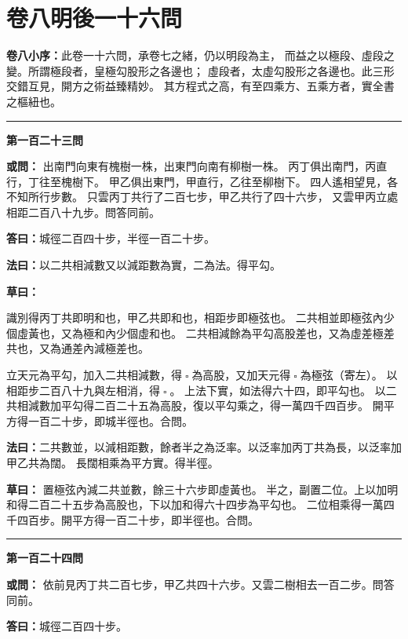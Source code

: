 \documentclass[11pt,a4paper]{article}
\let\origsquare\square
\renewcommand{\square}{\ensuremath{\origsquare}}%
\newcommand{\longline}{\noindent\rule{\textwidth}{0.4pt}}
\newcommand{\owen}[1]{%
  \par\vspace{0.4em}%
  \noindent\textcolor{problemcolor}{\textbf{或問：}}{\tradfont #1}\par\nopagebreak%
}
\newcommand{\fayue}[1]{%
  \par\noindent\textcolor{methodcolor}{\textbf{法曰：}}{\tradfont #1}\par\nopagebreak%
}
\newcommand{\tsaoyue}[1]{%
  \par\noindent\textcolor{workcolor}{\textbf{草曰：}}{\tradfont #1}\par%
}
\newcommand{\dayue}[1]{%
  \par\noindent\textcolor{anscolor}{\textbf{答曰：}}{\tradfont #1}\par\nopagebreak%
}
\newcommand{\wen}[1]{\par\vspace{0.3em}\noindent\textcolor{problemcolor}{\textbf{第#1問}}\par}
\begin{document}
\newpage


\section{\tradfont 卷八\quad 明後一十六問}
\label{sec:vol8}

\begin{tradfont}
\noindent\textbf{卷八小序：}此卷一十六問，承卷七之緒，仍以明段為主，
而益之以極段、虛段之變。所謂極段者，皇極勾股形之各邊也；
虛段者，太虛勾股形之各邊也。此三形交錯互見，開方之術益臻精妙。
其方程式之高，有至四乘方、五乘方者，實全書之樞紐也。
\end{tradfont}

\vspace{0.3cm}
\begin{center}
\longline
\end{center}

\wen{一百二十三}
\owen{%
出南門向東有槐樹一株，出東門向南有柳樹一株。
丙丁俱出南門，丙直行，丁往至槐樹下。
甲乙俱出東門，甲直行，乙往至柳樹下。
四人遙相望見，各不知所行步數。
只雲丙丁共行了二百七步，甲乙共行了四十六步，
又雲甲丙立處相距二百八十九步。問答同前。}
\dayue{城徑二百四十步，半徑一百二十步。}

\fayue{以二共相減數又以減距數為實，二為法。得平勾。}

\tsaoyue{%
識別得丙丁共即明和也，甲乙共即和也，相距步即極弦也。
二共相並即極弦內少個虛黃也，又為極和內少個虛和也。
二共相減餘為平勾高股差也，又為虛差極差共也，又為通差內減極差也。

立天元為平勾，加入二共相減數，得$ \; \square \; $為高股，又加天元得$ \; \square \; $為極弦（寄左）。
以相距步二百八十九與左相消，得$ \; \square \; $。
上法下實，如法得六十四，即平勾也。
以二共相減數加平勾得二百二十五為高股，復以平勾乘之，得一萬四千四百步。
開平方得一百二十步，即城半徑也。合問。}

\fayue{二共數並，以減相距數，餘者半之為泛率。以泛率加丙丁共為長，以泛率加甲乙共為闊。
長闊相乘為平方實。得半徑。}

\tsaoyue{%
置極弦內減二共並數，餘三十六步即虛黃也。
半之，副置二位。上以加明和得二百二十五步為高股也，下以加和得六十四步為平勾也。
二位相乘得一萬四千四百步。開平方得一百二十步，即半徑也。合問。}

\vspace{0.5cm}
\begin{center}
\longline
\end{center}

\wen{一百二十四}
\owen{%
依前見丙丁共二百七步，甲乙共四十六步。又雲二樹相去一百二步。問答同前。}
\dayue{城徑二百四十步。}
\end{document}
